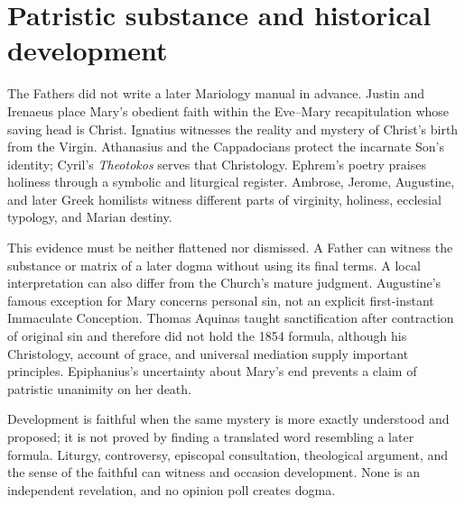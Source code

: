 \section{Patristic substance and historical development}

The Fathers did not write a later Mariology manual in advance. Justin and
Irenaeus place Mary's obedient faith within the Eve--Mary recapitulation whose
saving head is Christ. Ignatius witnesses the reality and mystery of Christ's
birth from the Virgin. Athanasius and the Cappadocians protect the incarnate
Son's identity; Cyril's \emph{Theotokos} serves that Christology. Ephrem's
poetry praises holiness through a symbolic and liturgical register. Ambrose,
Jerome, Augustine, and later Greek homilists witness different parts of
virginity, holiness, ecclesial typology, and Marian destiny.

This evidence must be neither flattened nor dismissed. A Father can witness
the substance or matrix of a later dogma without using its final terms. A local
interpretation can also differ from the Church's mature judgment. Augustine's
famous exception for Mary concerns personal sin, not an explicit first-instant
Immaculate Conception. Thomas Aquinas taught sanctification after contraction
of original sin and therefore did not hold the 1854 formula, although his
Christology, account of grace, and universal mediation supply important
principles. Epiphanius's uncertainty about Mary's end prevents a claim of
patristic unanimity on her death.

Development is faithful when the same mystery is more exactly understood and
proposed; it is not proved by finding a translated word resembling a later
formula. Liturgy, controversy, episcopal consultation, theological argument,
and the sense of the faithful can witness and occasion development. None is an
independent revelation, and no opinion poll creates dogma.

